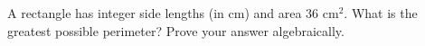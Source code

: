 A rectangle has integer side lengths (in cm) and area $36\text{ cm}^2$. What is the greatest possible perimeter? Prove your answer algebraically.
